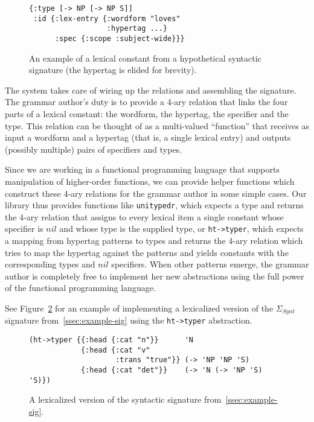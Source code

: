 \begin{figure}
  \centering
\begin{verbatim}
{:type [-> NP [-> NP S]]
 :id {:lex-entry {:wordform "loves"
                  :hypertag ...}
      :spec {:scope :subject-wide}}}
\end{verbatim}
  \caption{\label{fig:lex-const} An example of a lexical constant from a
    hypothetical syntactic signature (the hypertag is elided for brevity).}
\end{figure}

The system takes care of wiring up the relations and assembling the
signature. The grammar author's duty is to provide a 4-ary relation that
links the four parts of a lexical constant: the wordform, the hypertag,
the specifier and the type. This relation can be thought of as a
multi-valued ``function'' that receives as input a wordform and a
hypertag (that is, a single lexical entry) and outputs (possibly
multiple) pairs of specifiers and types.

Since we are working in a functional programming language that supports
manipulation of higher-order functions, we can provide helper functions
which construct these 4-ary relations for the grammar author in some
simple cases. Our library thus provides functions like
\texttt{unitypedr}, which expects a type and returns the 4-ary relation
that assigns to every lexical item a single constant whose specifier is
$nil$ and whose type is the supplied type, or \texttt{ht->typer}, which
expects a mapping from hypertag patterns to types and returns the 4-ary
relation which tries to map the hypertag against the patterns and yields
constants with the corresponding types and $nil$ specifiers. When other
patterns emerge, the grammar author is completely free to implement her
new abstractions using the full power of the functional programming
language.

See Figure~\ref{fig:lex-sig-impl} for an example of implementing a
lexicalized version of the $\Sigma_{Synt}$ signature
from~\ref{ssec:example-sig} using the \texttt{ht->typer} abstraction.

\begin{figure}
  \centering
\begin{verbatim}
(ht->typer {{:head {:cat "n"}}      'N
            {:head {:cat "v"
                    :trans "true"}} (-> 'NP 'NP 'S)
            {:head {:cat "det"}}    (-> 'N (-> 'NP 'S) 'S)})
\end{verbatim}
  \caption{\label{fig:lex-sig-impl} A lexicalized version of the
    syntactic signature from~\ref{ssec:example-sig}.}
\end{figure}

